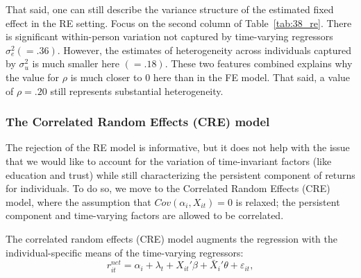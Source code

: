 \par That said, one can still describe the variance structure of the estimated fixed effect in the RE setting. Focus on the second column of Table~\ref{tab:38_re}. There is significant within-person variation not captured by time-varying regressors $\sigma_e^2(=.36)$. However, the estimates of heterogeneity across individuals captured by $\sigma_u^2$ is much smaller here $(=.18)$. These two features combined explains why the value for $\rho$ is much closer to $0$ here than in the FE model. That said, a value of $\rho=.20$ still represents substantial heterogeneity.

\FloatBarrier

\subsubsection{The Correlated Random Effects (CRE) model}

\par The rejection of the RE model is informative, but it does not help with the issue that we would like to account for the variation of time-invariant factors (like education and trust) while still characterizing the persistent component of returns for individuals. To do so, we move to the Correlated Random Effects (CRE) model, where the assumption that $Cov(\alpha_i, X_{it}) = 0$ is relaxed; the persistent component and time-varying factors are allowed to be correlated. 

\par The correlated random effects (CRE) model  augments the regression with the individual-specific means of the time-varying regressors:
\[
r^{net}_{it}
=
\alpha_i + \lambda_t + X_{it}'\beta + \bar{X}_i'\theta + \varepsilon_{it},
\]

